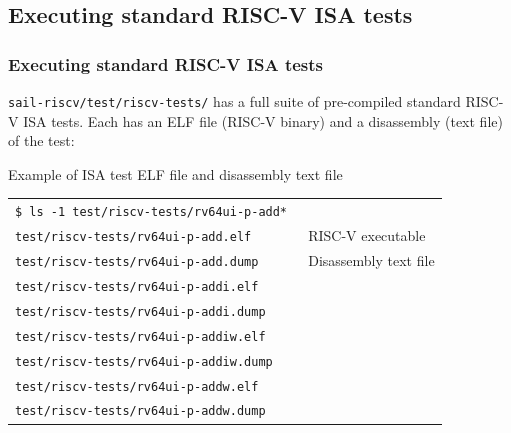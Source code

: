\documentclass[aspectratio=169]{beamer}
\newcommand{\hmm}{\hspace*{2em}}
\newcommand{\scripttt}{\scriptsize\tt}
\newcommand{\slidefont}{\scriptsize}
\begin{document}

\subsection{Executing standard RISC-V ISA tests}


\begin{frame}
  \frametitle{Executing standard RISC-V ISA tests}

  {\scripttt sail-riscv/test/riscv-tests/} has a full suite of
  pre-compiled standard RISC-V ISA tests.  Each has an ELF file
  (RISC-V binary) and a disassembly (text file) of the test:

  \begin{block}{Example of ISA test ELF file and disassembly text file}
    \slidefont
    \begin{tabular}{ll}
      \tt \$ ls -1 test/riscv-tests/rv64ui-p-add* \hmm & \\
      \tt test/riscv-tests/rv64ui-p-add.elf            & RISC-V executable \\
      \tt test/riscv-tests/rv64ui-p-add.dump           & Disassembly text file \\
      \tt test/riscv-tests/rv64ui-p-addi.elf           & \\
      \tt test/riscv-tests/rv64ui-p-addi.dump          & \\
      \tt test/riscv-tests/rv64ui-p-addiw.elf          & \\
      \tt test/riscv-tests/rv64ui-p-addiw.dump         & \\
      \tt test/riscv-tests/rv64ui-p-addw.elf           & \\
      \tt test/riscv-tests/rv64ui-p-addw.dump          &
    \end{tabular}
  \end{block}

\end{frame}

\end{document}
